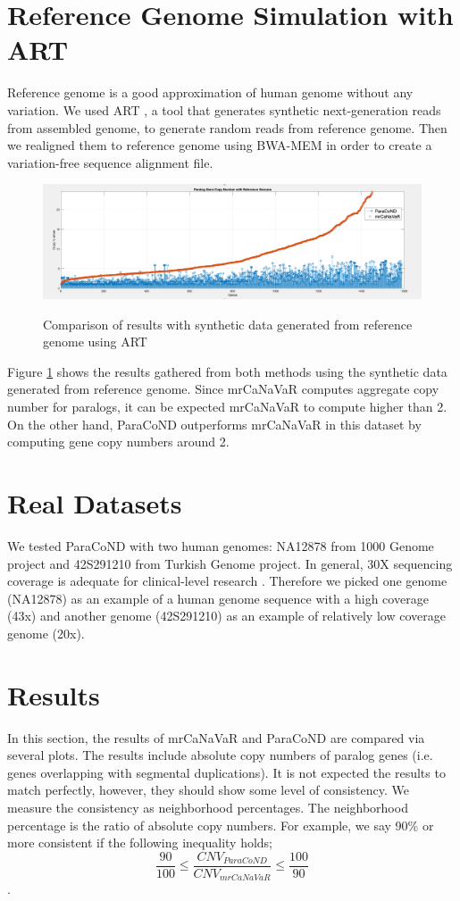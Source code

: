 \section{Reference Genome Simulation with ART}
Reference genome is a good approximation of human genome without any variation. We used ART \cite{huang2011art}, a tool that generates synthetic next-generation reads from assembled genome, to generate random reads from reference genome. Then we realigned them to reference genome using BWA-MEM \cite{li2013aligning} in order to create a variation-free sequence alignment file.

\begin{figure}
    \centering
    \caption{Comparison of results with synthetic data generated from reference genome using ART}
    \includegraphics[scale=0.50]{images/reference.png}
    \label{referenceResults}
\end{figure}

Figure \ref{referenceResults} shows the results gathered from both methods using the synthetic data generated from reference genome. Since mrCaNaVaR computes aggregate copy number for paralogs, it can be expected mrCaNaVaR to compute higher than 2. On the other hand, ParaCoND outperforms mrCaNaVaR in this dataset by computing gene copy numbers around 2.

\section{Real Datasets}
We tested ParaCoND with two human genomes: NA12878 from 1000 Genome project and 42S291210 from Turkish Genome project. In general, 30X sequencing coverage is adequate for clinical-level research \cite{shevchenko2016clinical}. Therefore we picked one genome (NA12878) \cite{eberle2017reference} as an example of a human genome sequence with a high coverage (43x) and another genome (42S291210) \cite{alkan2014whole} as an example of relatively low coverage genome (20x).

\section{Results}
In this section, the results of mrCaNaVaR and ParaCoND are compared via several plots. The results include absolute copy numbers of paralog genes (i.e. genes overlapping with segmental duplications). It is not expected the results to match perfectly, however, they should show some level of consistency. We measure the consistency as neighborhood percentages. The neighborhood percentage is the ratio of absolute copy numbers. For example, we say 90\% or more consistent if the following inequality holds; $$\frac{90}{100} \leq \frac{CNV_{ParaCoND}}{CNV_{mrCaNaVaR}} \leq \frac{100}{90} $$.


